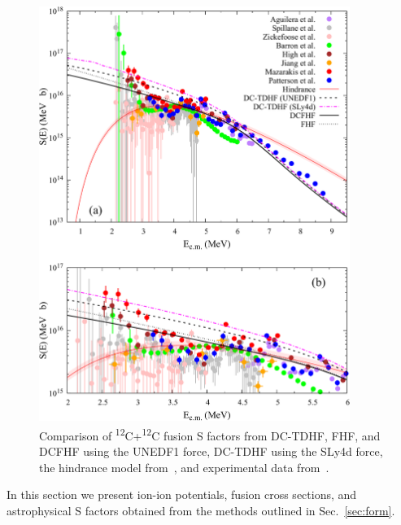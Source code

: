 \begin{figure}
	\includegraphics*[width=0.9\textwidth]{../Figures/CC/SFactors.pdf}
	\caption{Comparison of \textsuperscript{12}C+\textsuperscript{12}C fusion S factors from DC-TDHF, FHF, and DCFHF using the UNEDF1 force, DC-TDHF using the SLy4d force, the hindrance model from~\protect\citep{jiang2007}, and experimental data from~\protect\citep{aguilera2006,spillane2007,zickefoose2011,barron-palos2006,high1977,jiang2018,mazarakis1973,patterson1969}. }
	\label{fig:sfac}
\end{figure}

In this section we present ion-ion potentials, fusion cross sections, and astrophysical S factors obtained from the methods outlined in Sec.~\ref{sec:form}.

